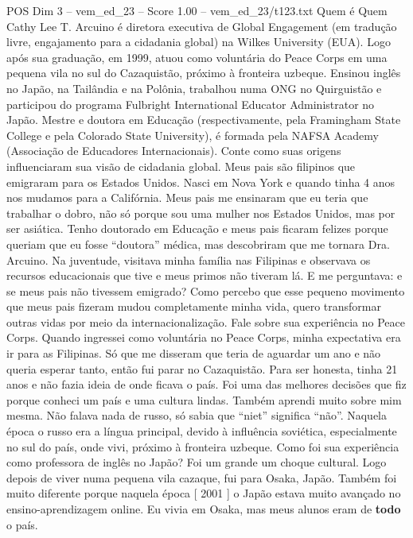 \begin{textsample}{POS Dim 3 – vem\_ed\_23 – Score 1.00 – vem\_ed\_23/t123.txt}  \label{ex:f3_pos_037}
Quem é Quem Cathy Lee T.
Arcuino é diretora executiva de Global Engagement (em tradução livre, engajamento para a cidadania global) na Wilkes University (EUA).
Logo após sua graduação, em 1999, atuou como voluntária do Peace Corps em uma pequena vila no sul do Cazaquistão, próximo à fronteira uzbeque.
Ensinou inglês no Japão, na Tailândia e na Polônia, trabalhou numa ONG no Quirguistão e participou do programa Fulbright International Educator Administrator no Japão.
Mestre e doutora em Educação (respectivamente, pela Framingham State College e pela Colorado State University), é formada pela NAFSA Academy (Associação de Educadores Internacionais).
Conte como suas origens influenciaram sua visão de cidadania global.
Meus pais são filipinos que emigraram para os Estados Unidos.
Nasci em Nova York e quando tinha 4 anos nos mudamos para a Califórnia.
Meus pais me ensinaram que eu teria que trabalhar o dobro, não só porque sou uma mulher nos Estados Unidos, mas por ser asiática.
Tenho doutorado em Educação e meus pais ficaram felizes porque queriam que eu fosse “doutora” médica, mas descobriram que me tornara Dra.
Arcuino.
Na juventude, visitava minha família nas Filipinas e observava os recursos educacionais que tive e meus primos não tiveram lá.
E me perguntava: e se meus pais não tivessem emigrado?
Como percebo que esse pequeno movimento que meus pais fizeram mudou completamente minha vida, quero transformar outras vidas por meio da internacionalização.
Fale sobre sua experiência no Peace Corps.
Quando ingressei como voluntária no Peace Corps, minha expectativa era ir para as Filipinas.
Só que me disseram que teria de aguardar um ano e não queria esperar tanto, então fui parar no Cazaquistão.
Para ser honesta, tinha 21 anos e não fazia ideia de onde ficava o país.
Foi uma das melhores decisões que fiz porque conheci um país e uma cultura lindas.
Também aprendi muito sobre mim mesma.
Não falava nada de russo, só sabia que “niet” significa “não”.
Naquela época o russo era a língua principal, devido à influência soviética, especialmente no sul do país, onde vivi, próximo à fronteira uzbeque.
Como foi sua experiência como professora de inglês no Japão?
Foi um grande um choque cultural.
Logo depois de viver numa pequena vila cazaque, fui para Osaka, Japão.
Também foi muito diferente porque naquela época [ 2001 ] o Japão estava muito avançado no ensino-aprendizagem online.
Eu vivia em Osaka, mas meus alunos eram de \textbf{todo} o país.

\end{textsample}
